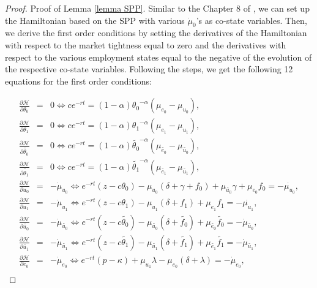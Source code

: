 \documentclass[12pt]{article} %
\theoremstyle{definition}
\begin{document}
\begin{proof}{Proof of Lemma \ref{lemma SPP}.}
Similar to the Chapter 8 of \cite{pissarides2000equilibrium}, we can set up the Hamiltonian based on the SPP with various $\dot{\mu}_0$'s as co-state variables. Then, we derive the first order conditions by setting the derivatives of the Hamiltonian with respect to the market tightness equal to zero and the derivatives with respect to the various employment states equal to the negative of the evolution of the respective co-state variables. Following the steps, we get the following 12 equations for the first order conditions:

\begin{eqnarray}
    \frac{\partial \mathcal{H}}{\partial \theta_0} &=& 0 \iff ce^{-rt}=(1-\alpha){\theta_0}^{-\alpha} (\mu_{e_0}-\mu_{u_0}), \label{foc1} \\
    \frac{\partial \mathcal{H}}{\partial \theta_1} &=& 0 \iff ce^{-rt}=(1-\alpha){\theta_1}^{-\alpha} (\mu_{e_1}-\mu_{u_1}), \label{foc2}\\
     \frac{\partial \mathcal{H}}{\partial \tilde{\theta_0}} &=& 0 \iff ce^{-rt}=(1-\alpha){\tilde{\theta_0}}^{-\alpha} (\mu_{\tilde{e_0}}-\mu_{\tilde{u_0}}), \label{foc3}\\
      \frac{\partial \mathcal{H}}{\partial \tilde{\theta_1}} &=& 0 \iff ce^{-rt}=(1-\alpha){\tilde{\theta_1}}^{-\alpha} (\mu_{\tilde{e_1}}-\mu_{\tilde{u_1}}), \label{foc4}\\
      \frac{\partial \mathcal{H}}{\partial u_0} &=& -\dot{\mu}_{u_0} \iff e^{-rt}(z-c\theta_0)-\mu_{u_0}(\delta+\gamma+f_0)+\mu_{\tilde{u_0}}\gamma + \mu_{e_0}f_0= -\dot{\mu_{u_0}}, \label{foc5}\\
       \frac{\partial \mathcal{H}}{\partial u_1} &=& -\dot{\mu}_{u_1} \iff e^{-rt}(z-c\theta_1)-\mu_{u_1}(\delta+f_1) + \mu_{e_1}f_1 = -\dot{\mu_{u_1}}, \label{foc6}\\
       \frac{\partial \mathcal{H}}{\partial \tilde{u_0}} &=& -\dot{\mu}_{\tilde{u_0}} \iff e^{-rt}(z-c\tilde{\theta_0})-\mu_{\tilde{u_0}}(\delta+\tilde{f_0}) + \mu_{\tilde{e_0}}\tilde{f_0} = -\dot{\mu}_{\tilde{u_0}}, \label{foc7}\\
      \frac{\partial \mathcal{H}}{\partial \tilde{u_1}} &=& -\dot{\mu}_{\tilde{u_1}} \iff e^{-rt}(z-c\tilde{\theta_1})-\mu_{\tilde{u_1}}(\delta+\tilde{f_1}) + \mu_{\tilde{e_1}}\tilde{f_1} = -\dot{\mu}_{\tilde{u_1}}, \label{foc8}\\ 
      \frac{\partial \mathcal{H}}{\partial e_0}  &=& -\dot{\mu}_{e_0} \iff e^{-rt}(p-\kappa)+\mu_{u_1} \lambda -\mu_{e_0}(\delta + \lambda) = -\dot{\mu}_{e_0}, \label{foc9}\\

\end{eqnarray}
\end{proof}
\end{document}
